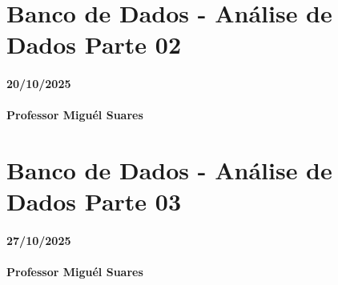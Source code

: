 \documentclass[
]{book}
\begin{document}
\chapter{Banco de Dados - Análise de Dados Parte 02}\label{banco-de-dados---anuxe1lise-de-dados-parte-02}

\subsubsection*{20/10/2025}\label{section-10}

\subsubsection*{Professor Miguél Suares}\label{professor-miguuxe9l-suares-10}

\chapter{Banco de Dados - Análise de Dados Parte 03}\label{banco-de-dados---anuxe1lise-de-dados-parte-03}

\subsubsection*{27/10/2025}\label{section-11}

\subsubsection*{Professor Miguél Suares}\label{professor-miguuxe9l-suares-11}

  
\end{document}

